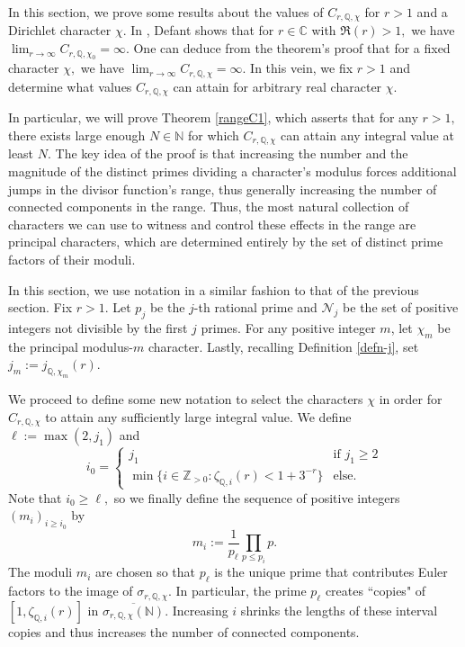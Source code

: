 \documentclass[12pt]{amsart}
\theoremstyle{definition}
\numberwithin{equation}{section}
\newcommand{\C}{\mathbb{C}}
\newcommand{\Q}{\mathbb{Q}}
\newcommand{\N}{\mathbb{N}}
\begin{document}
In this section, we prove some results about the values of $C_{r,\Q,\chi}$ for $r > 1$ and a Dirichlet character $\chi.$ In \cite[Theorem 3.3]{D16}, Defant shows that for $r \in \C$ with $\Re(r) > 1,$ we have $\lim_{r \rightarrow \infty} C_{r,\Q,\chi_0} = \infty.$ One can deduce from the theorem's proof that for a fixed character $\chi,$ we have $\lim_{r \rightarrow \infty} C_{r,\Q,\chi} = \infty.$ In this vein, we fix $r>1$ and determine what values $C_{r,\Q,\chi}$ can attain for arbitrary real character $\chi.$ 

In particular, we will prove Theorem \ref{rangeC1}, which asserts that for any $r > 1,$ there exists large enough $N \in \mathbb{N}$ for which $C_{r,\Q,\chi}$ can attain any integral value at least $N$. 
The key idea of the proof is that increasing the number and the magnitude of the distinct primes dividing a character's modulus forces additional jumps in the divisor function's range, thus generally increasing the number of connected components in the range. Thus, the most natural collection of characters we can use to witness and control these effects in the range are principal characters, which are determined entirely by the set of distinct prime factors of their moduli. 


In this section, we use notation in a similar fashion to that of the previous section. Fix $r > 1.$ Let $p_j$ be the $j$-th rational prime and $\mathcal{N}_j$ be the set of positive integers not divisible by the first $j$ primes. For any positive integer $m$, let $\chi_{m}$ be the principal modulus-$m$ character. Lastly, recalling Definition \ref{defn-j}, set $j_m:= j_{\Q,\chi_m}(r).$

We proceed to define some new notation to select the characters $\chi$ in order for $C_{r,\Q,\chi}$ to attain any sufficiently large integral value. We define $\ell := \max(2, j_1)$ and 
$$ i_0= \begin{cases}
    j_1 & \text{if }j_1 \geq 2 \\
    \min\bigl\{i\in \mathbb{Z}_{>0} : \zeta_{\Q, i}(r) < 1+3^{-r}\} & \text{else.}
\end{cases}$$
Note that $i_0 \geq \ell,$ so we finally define the sequence of positive integers $(m_i)_{i \geq i_0}$ by $$m_i := \frac{1}{p_\ell} \prod_{p \leq p_i} p.$$ The moduli $m_i$ are chosen so that $p_\ell$ is the unique prime that contributes Euler factors to the image of $\sigma_{r,\Q,\chi}$. In particular, the prime $p_\ell$ creates ``copies" of $[1, \zeta_{\Q,i}(r)]$ in $\overline{\sigma_{r,\Q,\chi}(\N)}$. Increasing $i$ shrinks the lengths of these interval copies and thus increases the number of connected components.
\end{document}

